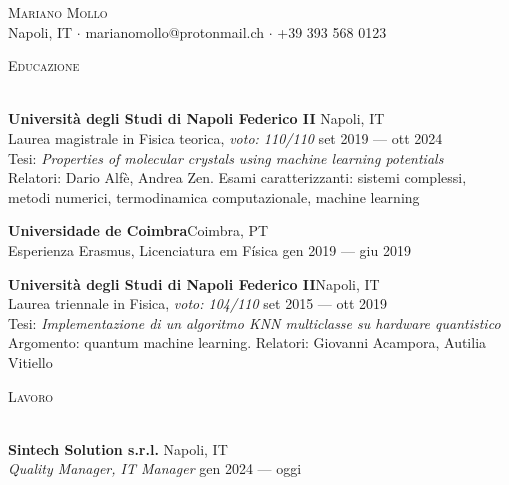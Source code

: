 \documentclass[a4paper]{article}
\newcommand{\lineunder} {
  \vspace*{-8pt} \\
  \hspace*{-18pt} \hrulefill \\
}
\newcommand{\header} [1] {
  {\hspace*{-18pt}\vspace*{6pt} \textsc{#1}}
  \vspace*{-6pt} \lineunder
}
\begin{document}
\vspace*{-40pt}

    

\vspace*{-10pt}
\begin{center}
  {\Huge \scshape {Mariano Mollo}}\\
  Napoli, IT $\cdot$ marianomollo@protonmail.ch $\cdot$ +39 393 568 0123\\
\end{center}

\header{Educazione}
\vspace{1mm}

\textbf{Università degli Studi di Napoli Federico II} \hfill Napoli, IT \\
Laurea magistrale in Fisica teorica, \textit{voto: 110/110} \hfill set 2019 --- ott 2024 \\
Tesi: \textit{Properties of molecular crystals using machine learning potentials} \\
Relatori: Dario Alfè, Andrea Zen.
Esami caratterizzanti: sistemi complessi, metodi numerici, termodinamica computazionale, machine learning

\vspace{2mm}

\textbf{Universidade de Coimbra}\hfill Coimbra, PT\\
Esperienza Erasmus, Licenciatura em Física \hfill gen 2019 --- giu 2019

\vspace{2mm}

\textbf{Università degli Studi di Napoli Federico II}\hfill Napoli, IT\\
Laurea triennale in Fisica, \textit{voto: 104/110} \hfill set 2015 --- ott 2019\\
Tesi: \textit{Implementazione di un algoritmo KNN multiclasse su hardware quantistico}\\
Argomento: quantum machine learning.
Relatori: Giovanni Acampora, Autilia Vitiello

\vspace{2mm}

\header{Lavoro}
\vspace{1mm}

\textbf{Sintech Solution s.r.l.} \hfill Napoli, IT \\
\textit{Quality Manager, IT Manager} \hfill gen 2024 --- oggi

\vspace{5mm}
\end{document}

